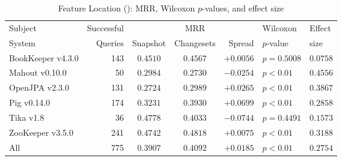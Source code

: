 \begin{table}[t]
\centering
\caption{Feature Location (\fone): MRR, Wilcoxon $p$-values, and effect size}
\begin{tabular}{l|r|ccr|ll}
\toprule
Subject & Successful &    & MRR &        & Wilcoxon  & Effect \\
System  & Queries    & Snapshot & Changesets  & Spread & $p$-value & size \\
\midrule
BookKeeper v4.3.0 & 143 & $0.4510$ & $\bm{0.4567}$ & $+0.0056$ & $p = 0.5008$ & $0.0758$ \\
Mahout v0.10.0 & 50 & $\bm{0.2984}$ & $0.2730$ & $-0.0254$ & $p < 0.01$ & $0.4556$ \\
OpenJPA v2.3.0 & 131 & $0.2724$ & $\bm{0.2989}$ & $+0.0265$ & $p < 0.01$ & $0.3867$ \\
Pig v0.14.0 & 174 & $0.3231$ & $\bm{0.3930}$ & $+0.0699$ & $p < 0.01$ & $0.2858$ \\
Tika v1.8 & 36 & $\bm{0.4778}$ & $0.4033$ & $-0.0744$ & $p = 0.4491$ & $0.1573$ \\
ZooKeeper v3.5.0 & 241 & $0.4742$ & $\bm{0.4818}$ & $+0.0075$ & $p < 0.01$ & $0.3188$ \\
\midrule
All & 775 & $0.3907$ & $\bm{0.4092}$ & $+0.0185$ & $p < 0.01$ & $0.2754$ \\
\bottomrule
\end{tabular}
\label{table:feature_location_rq1}
\end{table}
